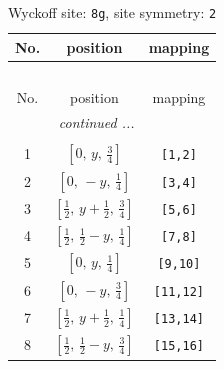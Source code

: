 \documentclass[fleqn,8pt]{jsarticle}
\begin{document}
\begin{longtable}{ccc}
\caption{Wyckoff site: {\tt 8g}, site symmetry: {\tt 2}}
 \\
 \hline \hline
No. & position & mapping \\ \hline \endfirsthead

\multicolumn{2}{l}{\tablename\ \thetable{}} \\
 \hline \hline
No. & position & mapping \\ \hline \endhead

 \hline \hline
\multicolumn{2}{r}{\footnotesize\it continued ...} \\ \endfoot

 \hline \hline
\multicolumn{2}{r}{} \\ \endlastfoot

1 & $\left[ 0,\, y,\, \frac{3}{4} \right]$ & {\tt [1,2]} \\ \hline
2 & $\left[ 0,\, - y,\, \frac{1}{4} \right]$ & {\tt [3,4]} \\ \hline
3 & $\left[ \frac{1}{2},\, y + \frac{1}{2},\, \frac{3}{4} \right]$ & {\tt [5,6]} \\ \hline
4 & $\left[ \frac{1}{2},\, \frac{1}{2} - y,\, \frac{1}{4} \right]$ & {\tt [7,8]} \\ \hline
5 & $\left[ 0,\, y,\, \frac{1}{4} \right]$ & {\tt [9,10]} \\ \hline
6 & $\left[ 0,\, - y,\, \frac{3}{4} \right]$ & {\tt [11,12]} \\ \hline
7 & $\left[ \frac{1}{2},\, y + \frac{1}{2},\, \frac{1}{4} \right]$ & {\tt [13,14]} \\ \hline
8 & $\left[ \frac{1}{2},\, \frac{1}{2} - y,\, \frac{3}{4} \right]$ & {\tt [15,16]} \\
\end{longtable}
\renewcommand{\arraystretch}{1.2}
\end{document}

